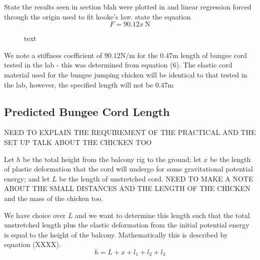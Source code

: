 \documentclass[a4paper]{article}
\begin{document}
State the results seen in section blah were plotted in and linear regression forced through the origin used to fit hooke's law. state the equation
\begin{equation}
F = 90.12x \ \si{\newton}
\end{equation}

\begin{figure}[h]
	\centering
	\caption{text}
\end{figure}

We note a stiffness coefficient of $90.12\si{\newton\per\meter}$ for the $0.47\si{\meter}$ length of bungee cord tested in the lab - this was determined from equation (6). The elastic cord material used for the bungee jumping chicken will be identical to that tested in the lab, however, the specified length will not be $0.47\si{\meter}$ 

\subsection{Predicted Bungee Cord Length}

NEED TO EXPLAIN THE REQUIREMENT OF THE PRACTICAL AND THE SET UP TALK ABOUT THE CHICKEN TOO

Let $h$ be the total height from the balcony rig to the ground; let $x$ be the length of plastic deformation that the cord will undergo for some gravitational potential energy; and let $L$ be the length of unstretched cord. NEED TO MAKE A NOTE ABOUT THE SMALL DISTANCES AND THE LENGTH OF THE CHICKEN and the mass of the chicken too.

We have choice over $L$ and we want to determine this length such that the total unstretched length plus the elastic deformation from the initial potential energy is equal to the height of the balcony. Mathematically this is described by equation (XXXX).
\begin{equation}
h = L + x + l_1 + l_2 + l_3
\end{equation}
\end{document}
